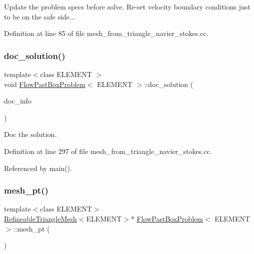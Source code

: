 Update the problem specs before solve. Re-\/set velocity boundary conditions just to be on the safe side... 



Definition at line 85 of file mesh\+\_\+from\+\_\+triangle\+\_\+navier\+\_\+stokes.\+cc.

\mbox{\label{classFlowPastBoxProblem_a7e2f3692ab8f492c6d5e967953c4a4ea}} 
\subsubsection{\texorpdfstring{doc\+\_\+solution()}{doc\_solution()}}
{\footnotesize\ttfamily template$<$class E\+L\+E\+M\+E\+NT $>$ \\
void \hyperlink{classFlowPastBoxProblem}{Flow\+Past\+Box\+Problem}$<$ E\+L\+E\+M\+E\+NT $>$\+::doc\+\_\+solution (\begin{DoxyParamCaption}\item[{Doc\+Info \&}]{doc\+\_\+info }\end{DoxyParamCaption})}



Doc the solution. 



Definition at line 297 of file mesh\+\_\+from\+\_\+triangle\+\_\+navier\+\_\+stokes.\+cc.



Referenced by main().

\mbox{\label{classFlowPastBoxProblem_a61a6212a46def12d33d68453489f4379}} 
\subsubsection{\texorpdfstring{mesh\+\_\+pt()}{mesh\_pt()}\hspace{0.1cm}{\footnotesize\ttfamily [1/2]}}
{\footnotesize\ttfamily template$<$class E\+L\+E\+M\+E\+NT$>$ \\
\hyperlink{classoomph_1_1RefineableTriangleMesh}{Refineable\+Triangle\+Mesh}$<$E\+L\+E\+M\+E\+NT$>$$\ast$ \hyperlink{classFlowPastBoxProblem}{Flow\+Past\+Box\+Problem}$<$ E\+L\+E\+M\+E\+NT $>$\+::mesh\+\_\+pt (\begin{DoxyParamCaption}{ }\end{DoxyParamCaption})\hspace{0.3cm}{\ttfamily [inline]}}




